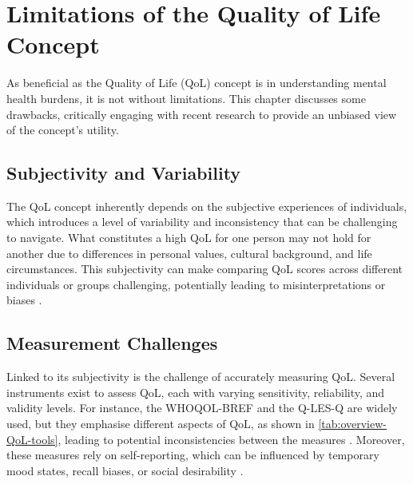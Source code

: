 \documentclass[10pt]{article}
\begin{document}
\begin{sloppypar}
  \section{Limitations of the Quality of Life Concept}
  \label{sec:limitations}

  As beneficial as the Quality of Life (QoL) concept is in understanding mental health burdens, it is not without limitations. This chapter discusses some drawbacks, critically engaging with recent research to provide an unbiased view of the concept's utility.

  \subsection{Subjectivity and Variability}
  \label{subsec:subjectivity}
  The QoL concept inherently depends on the subjective experiences of individuals, which introduces a level of variability and inconsistency that can be challenging to navigate. What constitutes a high QoL for one person may not hold for another due to differences in personal values, cultural background, and life circumstances. This subjectivity can make comparing QoL scores across different individuals or groups challenging, potentially leading to misinterpretations or biases \citep{skevington_expecting_2012}.

  \subsection{Measurement Challenges}
  \label{subsec:measurement}
  Linked to its subjectivity is the challenge of accurately measuring QoL. Several instruments exist to assess QoL, each with varying sensitivity, reliability, and validity levels. For instance, the WHOQOL-BREF and the Q-LES-Q are widely used, but they emphasise different aspects of QoL, as shown in \autoref{tab:overview-QoL-tools}, leading to potential inconsistencies between the measures \citep{endicott_quality_1993,harper_development_1998}. Moreover, these measures rely on self-reporting, which can be influenced by temporary mood states, recall biases, or social desirability \citep{bowling_just_2005}.


\end{sloppypar}
\end{document}
